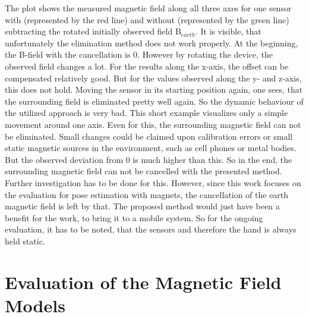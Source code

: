The plot shows the measured magnetic field along all three axes for one sensor with (represented by the red line) and without (represented by the green line) subtracting the rotated initially observed field $ \mathrm{B}_{earth} $. It is visible, that unfortunately the elimination method does not work properly. At the beginning, the B-field with the cancellation is 0. However by rotating the device, the observed field changes a lot. For the results along the x-axis, the offset can be compensated relatively good. But for the values observed along the y- and z-axis, this does not hold. Moving the sensor in its starting position again, one sees, that the surrounding field is eliminated pretty well again. So the dynamic behaviour of the utilized approach is very bad. This short example visualizes only a simple movement around one axis. Even for this, the surrounding magnetic field can not be eliminated. Small changes could be claimed upon calibration errors or small static magnetic sources in the environment, such as cell phones or metal bodies. But the observed deviation from 0 is much higher than this. So in the end, the surrounding magnetic field can not be cancelled with the presented method. Further investigation has to be done for this. However, since this work focuses on the evaluation for pose estimation with magnets, the cancellation of the earth magnetic field is left by that. The proposed method would just have been a benefit for the work, to bring it to a mobile system. So for the ongoing evaluation, it has to be noted, that the sensors and therefore the hand is always held static. 


\section{Evaluation of the Magnetic Field Models} \label{sec:modelDif}

